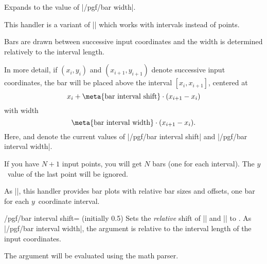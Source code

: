 \begin{command}{\pgfplotbarwidth}
	Expands to the value of |/pgf/bar width|.
\end{command}


\begin{command}{\pgfplothandlerybarinterval}
  This handler is a variant of |\pgfplothandlerybar| which works with intervals instead of points.
  
  Bars are drawn between successive input coordinates and the width is determined relatively to the interval length.
  
\begin{codeexample}[]
\end{codeexample}

In more detail, if $(x_i,y_i)$ and $(x_{i+1},y_{i+1})$ denote successive input coordinates, the bar will be placed above the interval $[x_i,x_{i+1}]$, centered at
\[ x_i + \text{\meta{bar interval shift}} \cdot (x_{i+1} - x_i) \]
with width
\[ \text{\meta{bar interval width}} \cdot (x_{i+1} - x_i). \]
Here,  and  denote the current values of |/pgf/bar interval shift| and |/pgf/bar interval width|.

If you have $N+1$ input points, you will get $N$ bars (one for each interval). The $y$~value of the last point will be ignored.
\end{command}

\begin{command}{\pgfplothandlerxbarinterval}
   As |\pgfplothandlerybarinterval|, this handler provides bar plots with relative bar sizes and offsets, one bar for each $y$~coordinate interval.
\end{command}

\label{key-bar-interval-shift}%
\begin{key}{/pgf/bar interval shift= (initially 0.5)}
	Sets the \emph{relative} shift of |\pgfplothandlerxbarinterval| and |\pgfplothandlerybarinterval| to . As |/pgf/bar interval width|, the argument is relative to the interval length of the input coordinates.
	
	The argument  will be evaluated using the math parser.
\end{key}

